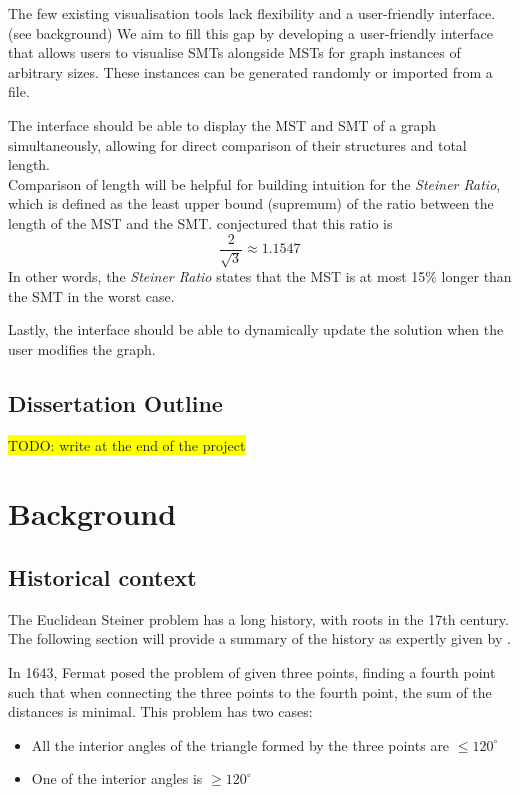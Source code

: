 \documentclass{l4proj}
\begin{document}
The few existing visualisation tools lack flexibility and a user-friendly interface. (see background)
We aim to fill this gap by developing a user-friendly interface that allows users to visualise SMTs alongside MSTs for graph instances of arbitrary sizes. These instances can be generated randomly or imported from a file.

The interface should be able to display the MST and SMT of a graph simultaneously, allowing for direct comparison of their structures and total length.
\\
Comparison of length will be helpful for building intuition for the \textit{Steiner Ratio},  which is defined as the least upper bound (supremum) of the ratio between the length of the MST and the SMT.  \cite{Gilbert1968SteinerMT} conjectured that this ratio is $$\frac{2}{\sqrt{3}} \approx 1.1547$$
In other words, the \textit{Steiner Ratio} states that the MST is at most 15\% longer than the SMT in the worst case.

Lastly, the interface should be able to dynamically update the solution when the user modifies the graph.

\section{Dissertation Outline}

\colorbox{yellow}{TODO: write at the end of the project}





\chapter{Background}

\section{Historical context}
The Euclidean Steiner problem has a long history, with roots in the 17th century. The following section will provide a summary of the history as expertly given by \cite{Brazil2014}.

In 1643, Fermat posed the problem of given three points, finding a fourth point such that when connecting the three points to the fourth point, the sum of the distances is minimal. This problem has two cases:
\begin{itemize}
    \item All the interior angles of the triangle formed by the three points are $\le 120^\circ$
    \item One of the interior angles is $\geq 120^\circ$
\end{itemize}
\end{document}
